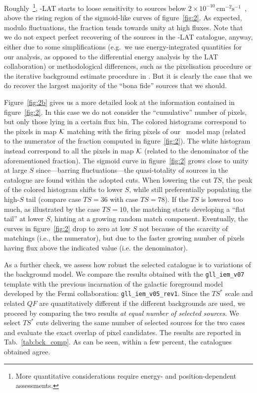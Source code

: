 Roughly~\footnote{More quantitative considerations require energy- and position-dependent assessments.}, \Fermi-LAT starts to loose sensitivity to sources below $2\times 10^{-10}\, \textrm{cm}^{-2}\textrm{s}^{-1}$~\cite{Zechlin:2015wdz,DiMauro:2017ing,Marcotulli:2020fpm,Amerio:2023uet}, above the rising region of the sigmoid-like curves of figure~\ref{fig:2}. As expected, modulo fluctuations, the fraction tends towards unity at high fluxes. Note that we do not expect perfect recovering of the sources in the \Fermi-LAT catalogue, anyway, either due to some simplifications (e.g.~we use energy-integrated quantities for our analysis, as opposed to the differential energy analysis by the LAT collaboration) or methodological differences, such as the pixelisation procedure or the iterative background estimate procedure in \Fermi. But it is clearly the case that we do recover the largest majority of the ``bona fide'' sources that we should. 

%
Figure~\ref{fig:2b} gives us a more detailed look at the information contained in figure~\ref{fig:2}. In this case we do not consider the ``cumulative'' number of pixels, but only those lying in a certain flux bin. The colored histograms correspond to the pixels in map ${\cal K}$ matching with the firing pixels of our \dNdS~model map (related to the numerator of the fraction computed in figure~\ref{fig:2}). The white histogram instead correspond to all the pixels in map ${\cal K}$ (related to the denominator of the aforementioned fraction). The sigmoid curve in figure~\ref{fig:2} grows close to unity at large $S$ since---barring fluctuations---the quasi-totality of sources in the catalogue are found within the adopted cuts. When lowering the cut $TS$, the peak of the colored histogram shifts to lower $S$, while still preferentially populating the high-$S$ tail (compare case $TS=36$ with case $TS=78$). If the $TS$ is lowered too much, as illustrated by the case $TS=10$, the matching starts developing a ``flat tail'' at lower $S$, hinting at a growing  random match component. Eventually, the curves in figure~\ref{fig:2} drop to zero at low $S$ not because of the scarcity of matchings (i.e., the numerator), but due to the faster growing number of pixels having flux above the indicated value (i.e. the denominator).

As a further check, we assess how  robust the selected catalogue is to variations of the background model. We compare the results obtained with the \verb|gll_iem_v07| template with the previous incarnation of the galactic foreground model developed by the Fermi collaboration: \verb|gll_iem_v05_rev1|. Since the $TS^*$ scale and related $QF$ are quantitatively different if the different backgrounds are used, we proceed by comparing the two results \textit{at equal number of selected sources}.  We select $TS^*$ cuts delivering the same number of selected sources for the two cases and evaluate the exact overlap of pixel candidates. The results are reported in Tab.~\ref{tab:bck_comp}. As can be seen, within a few percent, the catalogues obtained agree.


